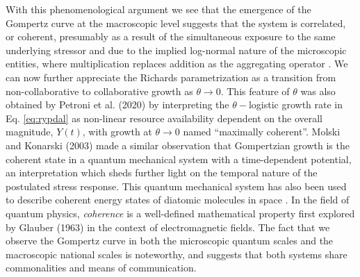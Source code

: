 \documentclass{article}
\begin{document}
With this phenomenological argument we see that the emergence of the Gompertz curve at the macroscopic level suggests that the system is correlated, or coherent, presumably as a result of the simultaneous exposure to the same underlying stressor and due to the implied log-normal nature of the microscopic entities, where multiplication replaces addition as the aggregating operator \cite{zhang1994log}. We can now further appreciate the Richards parametrization as a transition from non-collaborative to collaborative growth as $\theta \rightarrow 0$. 
This feature of $\theta$ was also obtained by Petroni et al. (2020) \cite{petroni2020logistic} by interpreting the $\theta-$logistic growth rate in Eq. \ref{eq:rypdal} as non-linear resource availability dependent on the overall magnitude, $Y(t)$, with growth at $\theta \rightarrow 0$ named ``maximally coherent''. 
Molski and Konarski (2003) \cite{molski2003coherent} made a similar observation that Gompertzian growth is the coherent state in a quantum mechanical system with a time-dependent potential, an interpretation which sheds further light on the temporal nature of the postulated stress response.
This quantum mechanical system has also been used to describe coherent energy states of diatomic molecules in space \cite{morse1929diatomic}. 
In the field of quantum physics, \emph{coherence} is a well-defined mathematical property first explored by Glauber (1963) \cite{glauber1963coherent} in the context of electromagnetic fields. The fact that we observe the Gompertz curve in both the microscopic quantum scales and the macroscopic national scales is noteworthy, and suggests that both systems share commonalities and means of communication.
\end{document}
